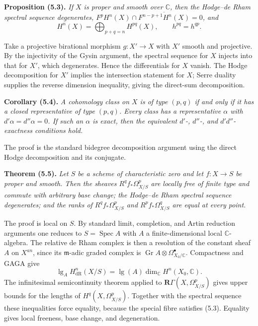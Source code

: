 \documentclass[11pt]{article}
\DeclareMathOperator{\Spec}{Spec}
\newcommand{\bR}{\mathbf R}
\newcommand{\C}{\mathbb C}
\newcommand{\length}{\operatorname{lg}}
\newenvironment{named}[1]{\par\medskip\noindent\textbf{#1}\itshape}{\par\medskip}
\begin{document}
\begin{named}{Proposition (5.3).}
If $X$ is proper and smooth over $\C$, then the Hodge--de Rham spectral sequence degenerates, $F^pH^n(X)\cap\overline{F^{n-p+1}H^n(X)}=0$, and
\[
H^n(X)=\bigoplus_{p+q=n}H^{pq}(X),\qquad h^{pq}=h^{qp}.
\]
\end{named}
Take a projective birational morphism $g:X'\to X$ with $X'$ smooth and projective. By the injectivity of the Gysin argument, the spectral sequence for $X$ injects into that for $X'$, which degenerates. Hence the differentials for $X$ vanish. The Hodge decomposition for $X'$ implies the intersection statement for $X$; Serre duality supplies the reverse dimension inequality, giving the direct-sum decomposition.

\begin{named}{Corollary (5.4).}
A cohomology class on $X$ is of type $(p,q)$ if and only if it has a closed representative of type $(p,q)$. Every class has a representative $\alpha$ with $d'\alpha=d''\alpha=0$. If such an $\alpha$ is exact, then the equivalent $d'$-, $d''$-, and $d'd''$-exactness conditions hold.
\end{named}
The proof is the standard bidegree decomposition argument using the direct Hodge decomposition and its conjugate.

\begin{named}{Theorem (5.5).}
Let $S$ be a scheme of characteristic zero and let $f:X\to S$ be proper and smooth. Then the sheaves $R^qf_*\Omega^p_{X/S}$ are locally free of finite type and commute with arbitrary base change; the Hodge--de Rham spectral sequence degenerates; and the ranks of $R^qf_*\Omega^p_{X/S}$ and $R^pf_*\Omega^q_{X/S}$ are equal at every point.
\end{named}
The proof is local on $S$. By standard limit, completion, and Artin reduction arguments one reduces to $S=\Spec A$ with $A$ a finite-dimensional local $\C$-algebra. The relative de Rham complex is then a resolution of the constant sheaf $A$ on $X^{an}$, since its $\mathfrak m$-adic graded complex is $\operatorname{Gr}A\otimes\Omega^\bullet_{X_0/\C}$. Compactness and GAGA give
\[
\length_AH^n_{\mathrm{dR}}(X/S)=\length(A)\dim_\C H^n(X_0,\C).
\]
The infinitesimal semicontinuity theorem applied to $\bR\Gamma(X,\Omega^p_{X/S})$ gives upper bounds for the lengths of $H^q(X,\Omega^p_{X/S})$. Together with the spectral sequence these inequalities force equality, because the special fibre satisfies (5.3). Equality gives local freeness, base change, and degeneration.
\end{document}
